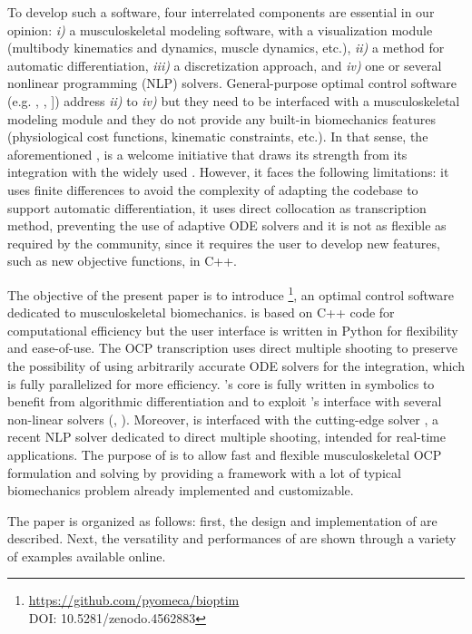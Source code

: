 To develop such a software, four interrelated components are essential in our opinion: \textit{i)} a musculoskeletal modeling software, with a visualization module (multibody kinematics and dynamics, muscle dynamics, etc.), \textit{ii)} a method for automatic differentiation, \textit{iii)} a discretization approach, and \textit{iv)} one or several nonlinear programming (NLP) solvers. 
General-purpose optimal control software (e.g. \gpopsii \cite{patterson2014gpops}, \muscodii \cite{leineweber2003efficient1,leineweber2003efficient2}, \acado \cite{houska2011acado}]) address \textit{ii)} to \textit{iv)} but they need to be interfaced with a musculoskeletal modeling module and they do not provide any built-in biomechanics features (physiological cost functions, kinematic constraints, etc.). 
In that sense, the aforementioned \moco, is a welcome initiative that draws its strength from its integration with the widely used \opensim.
However, it faces the following limitations: it uses finite differences to avoid the complexity of adapting the \opensim codebase to support automatic differentiation, it uses direct collocation as transcription method, preventing the use of adaptive ODE solvers and it is not as flexible as required by the community, since it requires the user to develop new features, such as new objective functions, in C++. 

The objective of the present paper is to introduce \bioptim\footnote{\url{https://github.com/pyomeca/bioptim}\\DOI: 10.5281/zenodo.4562883}, an  optimal control software dedicated to musculoskeletal biomechanics.
\bioptim is based on C++ code for computational efficiency but the user interface is written in Python for flexibility and ease-of-use. 
The OCP transcription uses direct multiple shooting to preserve the possibility of using arbitrarily accurate ODE solvers for the integration, which is fully parallelized for more efficiency.
\bioptim's core is fully written in \casadi symbolics to benefit from algorithmic differentiation and to exploit \casadi 's interface with several non-linear solvers (\ipopt, \snopt).
Moreover, \bioptim is interfaced with the cutting-edge solver \acados, a recent NLP solver dedicated to direct multiple shooting, intended for real-time applications.
The purpose of \bioptim is to allow fast and flexible musculoskeletal OCP formulation and solving by providing a framework with a lot of typical biomechanics problem already implemented and customizable.

The paper is organized as follows: first, the design and implementation of \bioptim are described.
Next, the versatility and performances of \bioptim are shown through a variety of examples available online. 
